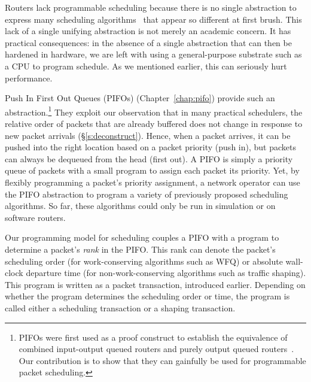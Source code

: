 Routers lack programmable scheduling because there is no single abstraction to
express many scheduling algorithms~\cite{wfq, srpt, srr, pFabric, lstf, csz}
that appear so different at first brush. This lack of a single unifying
abstraction is not merely an academic concern. It has practical consequences:
in the absence of a single abstraction that can then be hardened in hardware,
we are left with using a general-purpose substrate such as a CPU to program
schedule. As we mentioned earlier, this can seriously hurt performance.

 Push In First Out Queues (PIFOs) (Chapter~\ref{chap:pifo}) provide such an
abstraction.\footnote{PIFOs were first used as a proof construct to establish
the equivalence of combined input-output queued routers and purely output
queued routers~\cite{pifo}. Our contribution is to show that they can gainfully
be used for programmable packet scheduling.} They exploit our observation that
in many practical schedulers, the relative order of packets that are already
buffered does not change in response to new packet arrivals
(\S\ref{s:deconstruct}). Hence, when a packet arrives, it can be pushed into
the right location based on a packet priority (push in), but packets can always
be dequeued from the head (first out). A PIFO is simply a
priority queue of packets with a small program to assign each packet its
priority. Yet, by flexibly programming a packet's priority assignment, a
network operator can use the PIFO abstraction to program a variety of
previously proposed scheduling algorithms. So far, these algorithms could only
be run in simulation or on software routers.

 Our programming model for
scheduling couples a PIFO with a program to determine a packet's {\em rank} in
the PIFO. This rank can denote the packet's scheduling order (for
work-conserving algorithms such as WFQ) or absolute wall-clock departure time
(for non-work-conserving algorithms such as traffic shaping). This program is
written as a packet transaction, introduced earlier.  Depending on whether the
program determines the scheduling order or time, the program is called either a
scheduling transaction or a shaping transaction.

